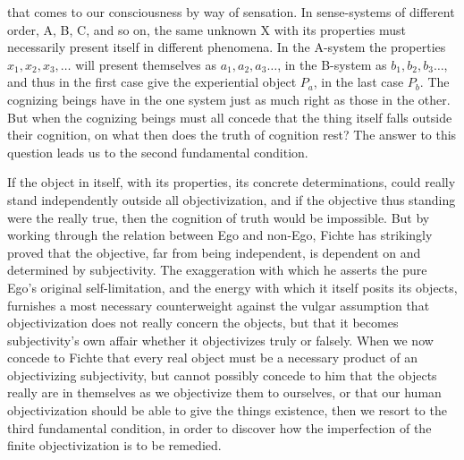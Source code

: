 \documentclass[12pt]{article}
\begin{document}
that comes to our consciousness by way of sensation. In sense-systems of
different order, A, B, C, and so on, the same unknown X with its properties
must necessarily present itself in different phenomena. In the A-system the
properties $x_1, x_2, x_3, \ldots$ will present themselves
as $a_1, a_2, a_3\ldots$, in the B-system as $b_1, b_2, b_3\ldots$, and
thus in the first case give the experiential object $P_a$, in the last case
$P_b$. The cognizing beings have in the one system just as much right as
those in the other. But when the cognizing beings must all concede that the
thing itself falls outside their cognition, on what then does the truth of
cognition rest? The answer to this question leads us to the second
fundamental condition.

If the object in itself, with its properties, its concrete determinations,
could really stand independently outside all objectivization, and if the
objective thus standing were the really true, then the cognition of truth
would be impossible. But by working through the relation between Ego and
non-Ego, Fichte has strikingly proved that the objective, far from being
independent, is dependent on and determined by subjectivity. The
exaggeration with which he asserts the pure Ego's original self-limitation,
and the energy with which it itself posits its objects, furnishes a most
necessary counterweight against the vulgar assumption that objectivization
does not really concern the objects, but that it becomes subjectivity's own
affair whether it objectivizes truly or falsely. When we now concede to
Fichte that every real object must be a necessary product of an
objectivizing subjectivity, but cannot possibly concede to him that the
objects really are in themselves as we objectivize them to ourselves, or
that our human objectivization should be able to give the things existence,
then we resort to the third fundamental condition, in order to discover how
the imperfection of the finite objectivization is to be remedied.
\end{document}
